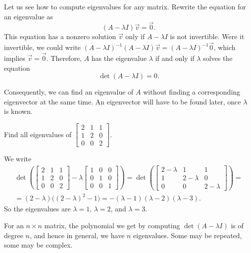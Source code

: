 Let us see how to compute eigenvalues for any matrix.
Rewrite the equation for an eigenvalue as
\begin{equation*}
(A - \lambda I)\vec{v} = \vec{0} .
\end{equation*}
This equation has a nonzero solution $\vec{v}$ only if 
$A - \lambda I$ is not invertible.  Were it invertible,
we could write
${(A - \lambda I)}^{-1}(A - \lambda I)\vec{v} = {(A-\lambda I)}^{-1}\vec{0}$,
which implies $\vec{v} = \vec{0}$.  Therefore,
$A$ has the
eigenvalue $\lambda$ if and only if $\lambda$ solves the equation
\begin{equation*}
\det (A-\lambda I) = 0 .
\end{equation*}

Consequently, we can find an eigenvalue of $A$ without
finding a corresponding eigenvector at the same time.  An eigenvector will have to be
found later, once $\lambda$ is known.

\begin{example}
Find all eigenvalues of 
$\left[ \begin{smallmatrix}
2 & 1 & 1 \\
1 & 2 & 0 \\
0 & 0 & 2
\end{smallmatrix} \right]$.

We write
\begin{multline*}
\det \left(
\begin{bmatrix}
2 & 1 & 1 \\
1 & 2 & 0 \\
0 & 0 & 2
\end{bmatrix}
- \lambda 
\begin{bmatrix}
1 & 0 & 0 \\
0 & 1 & 0 \\
0 & 0 & 1
\end{bmatrix}
\right)
=
\det \left(
\begin{bmatrix}
2-\lambda & 1 & 1 \\
1 & 2-\lambda & 0 \\
0 & 0 & 2-\lambda
\end{bmatrix}
\right)
= \\
=
(2-\lambda) \bigl({(2-\lambda)}^2 - 1\bigr)
= 
-(\lambda -1)(\lambda -2)(\lambda-3) .
\end{multline*}
So the eigenvalues are $\lambda = 1$, $\lambda = 2$, and
$\lambda = 3$.
\end{example}

For an $n \times n$ matrix, the polynomial we get by
computing $\det(A - \lambda I)$ is of degree $n$, and hence
in general, we have $n$ eigenvalues.  Some may be repeated, some may be
complex.

